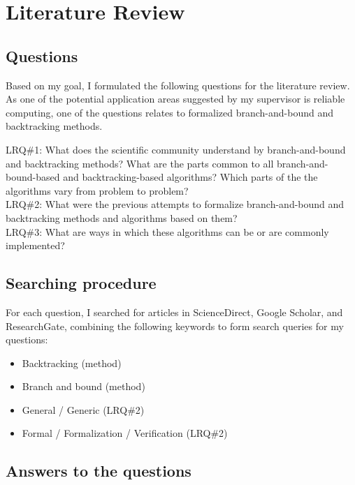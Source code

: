 \chapter{Literature Review}
\label{chap:lr}

\section{Questions}

Based on my goal, I formulated the following questions for the literature review. As one of
the potential application areas suggested by my supervisor is reliable computing, one of
the questions relates to formalized branch-and-bound and backtracking methods.

LRQ\#1: What does the scientific community understand by branch-and-bound and backtracking methods?
What are the parts common to all branch-and-bound-based and backtracking-based algorithms?
Which parts of the the algorithms vary from problem to problem? \\

LRQ\#2: What were the previous attempts to formalize branch-and-bound and backtracking methods
and algorithms based on them? \\

LRQ\#3: What are ways in which these algorithms can be or are commonly implemented? \\

\section{Searching procedure}

For each question, I searched for articles in ScienceDirect,
Google Scholar, and ResearchGate, combining the following keywords to form search queries
for my questions:

\begin{itemize}
    \item Backtracking (method)
    \item Branch and bound (method)
    \item General / Generic (LRQ\#2)
    \item Formal / Formalization / Verification (LRQ\#2)
\end{itemize}

\section{Answers to the questions}

